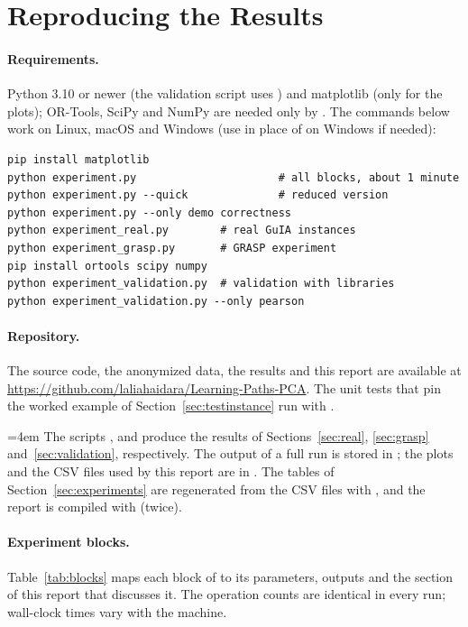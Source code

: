 \section{Reproducing the Results}\label{app:run}

\paragraph{Requirements.} Python 3.10 or newer (the validation script uses ) and matplotlib (only for the plots); OR-Tools, SciPy and NumPy are needed only by . The commands below work on Linux, macOS and Windows (use  in place of  on Windows if needed):
\begin{verbatim}
pip install matplotlib
python experiment.py                      # all blocks, about 1 minute
python experiment.py --quick              # reduced version
python experiment.py --only demo correctness
python experiment_real.py        # real GuIA instances
python experiment_grasp.py       # GRASP experiment
pip install ortools scipy numpy
python experiment_validation.py  # validation with libraries
python experiment_validation.py --only pearson
\end{verbatim}
\paragraph{Repository.} The source code, the anonymized data, the results and this report are available at \url{https://github.com/laliahaidara/Learning-Paths-PCA}. The unit tests that pin the worked example of Section~\ref{sec:testinstance} run with .

{\emergencystretch=4em The scripts ,  and  produce the results of Sections~\ref{sec:real}, \ref{sec:grasp} and~\ref{sec:validation}, respectively. The output of a full run is stored in ; the plots and the CSV files used by this report are in . The tables of Section~\ref{sec:experiments} are regenerated from the CSV files with , and the report is compiled with  (twice).\par}

\paragraph{Experiment blocks.} Table~\ref{tab:blocks} maps each block of  to its parameters, outputs and the section of this report that discusses it. The operation counts are identical in every run; wall-clock times vary with the machine.

